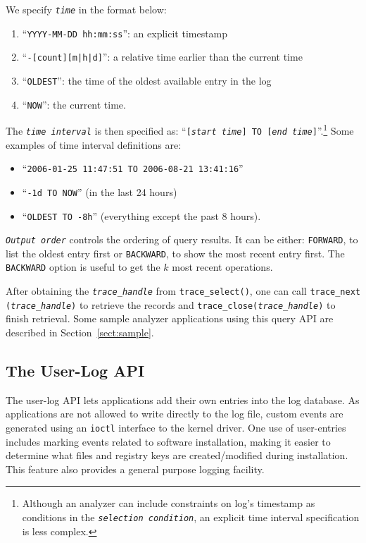 We specify {\small\tt {\it time}} in the format below:
\begin{enumerate}
\item ``{\small\tt YYYY-MM-DD hh:mm:ss}'': an explicit timestamp
\item ``{\small\tt -[count][m|h|d]}'': a relative time earlier than the current time
\item ``{\small\tt OLDEST}'': the time of the oldest available entry in the log
\item ``{\small\tt NOW}'': the current time.
\end{enumerate}

The {\small\tt {\it time interval}} is then specified as: ``{\small\tt [{\it start time}] 
TO [{\it end time}]}''.\footnote{ Although an
analyzer can include constraints on log's timestamp as conditions in the
{\small\tt {\it selection condition}}, an explicit time interval specification is
less complex.  }
Some examples of time interval definitions are:

\begin{itemize}
\item ``{\small\tt 2006-01-25 11:47:51 TO 2006-08-21 13:41:16}''
\item ``{\small\tt -1d TO NOW}'' (in the last 24 hours)
\item ``{\small\tt OLDEST TO -8h}'' (everything except the past 8 hours).
\end{itemize}

{\small\tt {\it Output order}} controls the ordering of query results.  It can be
either: {\small\tt FORWARD}, to list the oldest entry first or {\small\tt BACKWARD}, to
show the most recent entry first.  The {\small\tt BACKWARD} option is useful to get
the $k$ most recent operations.

After obtaining the {\small\tt {\it trace\_handle}} from {\small\tt trace\_select()},
one can call {\small\tt trace\_next ({\it trace\_handle})} to retrieve the records
and {\small\tt trace\_close({\it trace\_handle})} to finish retrieval.
Some sample analyzer applications using this query API are described in
Section~\ref{sect:sample}.


\subsection{The User-Log API}
\label{sect:custlog}

The user-log API lets applications add their own entries into the log
database.  As applications are not allowed to write directly to the log file,
custom events are generated using an {\small\tt ioctl} interface to the kernel
driver.  One use of user-entries includes marking events related to software
installation, making it easier to determine what files and registry keys are
created/modified during installation.  This feature also provides a general
purpose logging facility.

